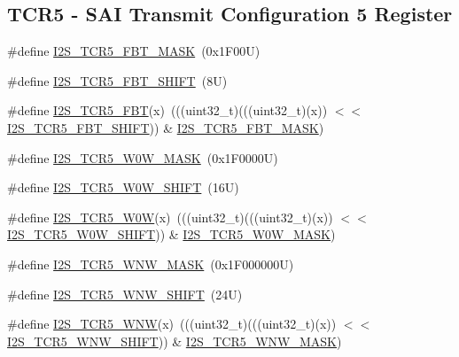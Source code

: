 \subsection*{T\+C\+R5 -\/ S\+AI Transmit Configuration 5 Register}
\begin{DoxyCompactItemize}
\item 
\#define \mbox{\hyperlink{group___i2_s___register___masks_ga95e32e5df1218cb76b09a99f46d9eca2}{I2\+S\+\_\+\+T\+C\+R5\+\_\+\+F\+B\+T\+\_\+\+M\+A\+SK}}~(0x1\+F00\+U)
\item 
\#define \mbox{\hyperlink{group___i2_s___register___masks_gaaeadb079b059ec5d832aa9bce021f0ab}{I2\+S\+\_\+\+T\+C\+R5\+\_\+\+F\+B\+T\+\_\+\+S\+H\+I\+FT}}~(8\+U)
\item 
\#define \mbox{\hyperlink{group___i2_s___register___masks_gae719019b98cc529d200d8570f3b62f05}{I2\+S\+\_\+\+T\+C\+R5\+\_\+\+F\+BT}}(x)~(((uint32\+\_\+t)(((uint32\+\_\+t)(x)) $<$$<$ \mbox{\hyperlink{group___i2_s___register___masks_gaaeadb079b059ec5d832aa9bce021f0ab}{I2\+S\+\_\+\+T\+C\+R5\+\_\+\+F\+B\+T\+\_\+\+S\+H\+I\+FT}})) \& \mbox{\hyperlink{group___i2_s___register___masks_ga95e32e5df1218cb76b09a99f46d9eca2}{I2\+S\+\_\+\+T\+C\+R5\+\_\+\+F\+B\+T\+\_\+\+M\+A\+SK}})
\item 
\#define \mbox{\hyperlink{group___i2_s___register___masks_ga8c6552a52f0e99068ae8869056e78ccb}{I2\+S\+\_\+\+T\+C\+R5\+\_\+\+W0\+W\+\_\+\+M\+A\+SK}}~(0x1\+F0000\+U)
\item 
\#define \mbox{\hyperlink{group___i2_s___register___masks_ga0b9f1161cd97d2be7e9ee7f680293e3d}{I2\+S\+\_\+\+T\+C\+R5\+\_\+\+W0\+W\+\_\+\+S\+H\+I\+FT}}~(16\+U)
\item 
\#define \mbox{\hyperlink{group___i2_s___register___masks_ga5b0a26e0153652855de151bbbc7e8303}{I2\+S\+\_\+\+T\+C\+R5\+\_\+\+W0W}}(x)~(((uint32\+\_\+t)(((uint32\+\_\+t)(x)) $<$$<$ \mbox{\hyperlink{group___i2_s___register___masks_ga0b9f1161cd97d2be7e9ee7f680293e3d}{I2\+S\+\_\+\+T\+C\+R5\+\_\+\+W0\+W\+\_\+\+S\+H\+I\+FT}})) \& \mbox{\hyperlink{group___i2_s___register___masks_ga8c6552a52f0e99068ae8869056e78ccb}{I2\+S\+\_\+\+T\+C\+R5\+\_\+\+W0\+W\+\_\+\+M\+A\+SK}})
\item 
\#define \mbox{\hyperlink{group___i2_s___register___masks_gac7d0e32e2822b95984bd4c98097848e0}{I2\+S\+\_\+\+T\+C\+R5\+\_\+\+W\+N\+W\+\_\+\+M\+A\+SK}}~(0x1\+F000000\+U)
\item 
\#define \mbox{\hyperlink{group___i2_s___register___masks_ga76459cafce1757f4ea37a3fca81514a7}{I2\+S\+\_\+\+T\+C\+R5\+\_\+\+W\+N\+W\+\_\+\+S\+H\+I\+FT}}~(24\+U)
\item 
\#define \mbox{\hyperlink{group___i2_s___register___masks_ga875934bf1e82a195cf9bd7414c9deac1}{I2\+S\+\_\+\+T\+C\+R5\+\_\+\+W\+NW}}(x)~(((uint32\+\_\+t)(((uint32\+\_\+t)(x)) $<$$<$ \mbox{\hyperlink{group___i2_s___register___masks_ga76459cafce1757f4ea37a3fca81514a7}{I2\+S\+\_\+\+T\+C\+R5\+\_\+\+W\+N\+W\+\_\+\+S\+H\+I\+FT}})) \& \mbox{\hyperlink{group___i2_s___register___masks_gac7d0e32e2822b95984bd4c98097848e0}{I2\+S\+\_\+\+T\+C\+R5\+\_\+\+W\+N\+W\+\_\+\+M\+A\+SK}})
\end{DoxyCompactItemize}

